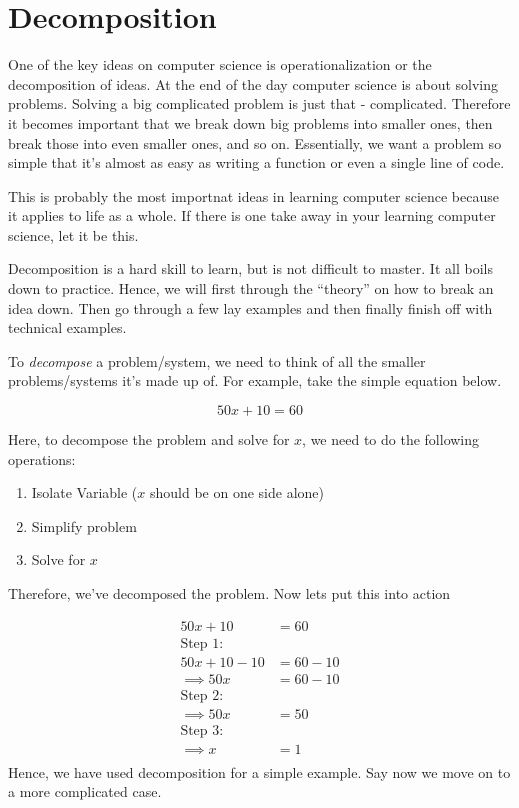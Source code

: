 \documentclass[12pt,a4paper]{book}
\begin{document}
		\section{Decomposition}
			One of the key ideas on computer science is operationalization or the decomposition of ideas. At the end of the day computer science is about solving problems. Solving a big complicated problem is just that - complicated. Therefore it becomes important that we break down big problems into smaller ones, then break those into even smaller ones, and so on. Essentially, we want a problem so simple that it's almost as easy as writing a function or even a single line of code.
			
			This is probably the most importnat ideas in learning computer science because it applies to life as a whole. If there is one take away in your learning computer science, let it be this.
			
			Decomposition is a hard skill to learn, but is not difficult to master. It all boils down to practice. Hence, we will first through the ``theory'' on how to break an idea down. Then go through a few lay examples and then finally finish off with technical examples.
			
			To \textit{decompose} a problem/system, we need to think of all the smaller problems/systems it's made up of. For example, take the simple equation below.

			\begin{equation*}
				50x + 10 = 60
			\end{equation*}

			Here, to decompose the problem and solve for $x$, we need to do the following operations:

			\begin{enumerate}
				\item Isolate Variable ($x$ should be on one side alone)
				\item Simplify problem
				\item Solve for $x$
			\end{enumerate}
			
			Therefore, we've decomposed the problem. Now lets put this into action

			\begin{align*}
				50x + 10 &= 60 \\
				\text{Step 1}:& \\
				50x + 10 - 10 &= 60 - 10 \\
				\implies 50x &= 60 - 10 \\
				\text{Step 2}:& \\
				\implies 50x &= 50 \\
				\text{Step 3}:& \\
				\implies x &= 1 \\
			\end{align*}
			Hence, we have used decomposition for a simple example. Say now we move on to a more complicated case. 
			
\end{document}
